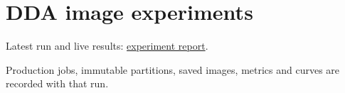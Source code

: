 \section{DDA image
experiments}\label{record-docs-image-results-md-dda-image-experiments}

Latest run and live results:
\href{../results/research_workflow/image_dda/20261025T003439026166Z/report.md}{experiment
report}.

Production jobs, immutable partitions, saved images, metrics and curves
are recorded with that run.

